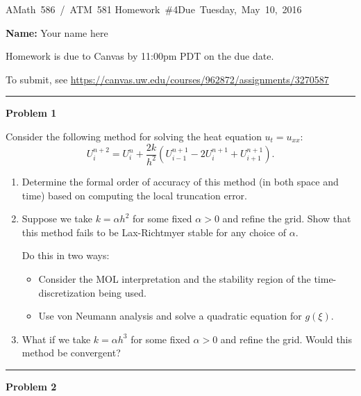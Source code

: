 \documentclass[10pt]{article}
\begin{document}
\hfill\vbox{\hbox{AMath 586 / ATM 581}
\hbox{Homework \#4}\hbox{Due Tuesday, May 10, 2016}}

{\bf Name:} Your name here
\vskip 5pt

Homework is due to Canvas by 11:00pm PDT on the due date.

To submit, see \url{https://canvas.uw.edu/courses/962872/assignments/3270587}


\vskip 1cm
\hrule
{\bf Problem 1}  


Consider the following method for solving the heat equation
$u_t=u_{xx}$:
\[
U_i^{n+2} = U_i^n + \frac{2k}{h^2}(U_{i-1}^{n+1} - 2U_i^{n+1} +
U_{i+1}^{n+1}).
\]
\begin{enumerate}
\item Determine the formal order of accuracy of this method 
(in both space and time) based on computing the local truncation error.

\item Suppose we take $k=\alpha h^2$ for some fixed $\alpha>0$ and refine
the grid.  Show that this method fails to be 
Lax-Richtmyer stable for any choice of $\alpha$.

Do this in two ways: 
\begin{itemize}
\item Consider the MOL interpretation and the stability region of
the time-discretization being used.
\item Use von Neumann analysis and solve a quadratic equation for $g(\xi)$.
\end{itemize} 

\item What if we take $k=\alpha h^3$ for some fixed $\alpha>0$ and refine
the grid. Would this method be convergent?

\end{enumerate}




\vskip 1cm
\hrule
{\bf Problem 2}  
\end{document}
